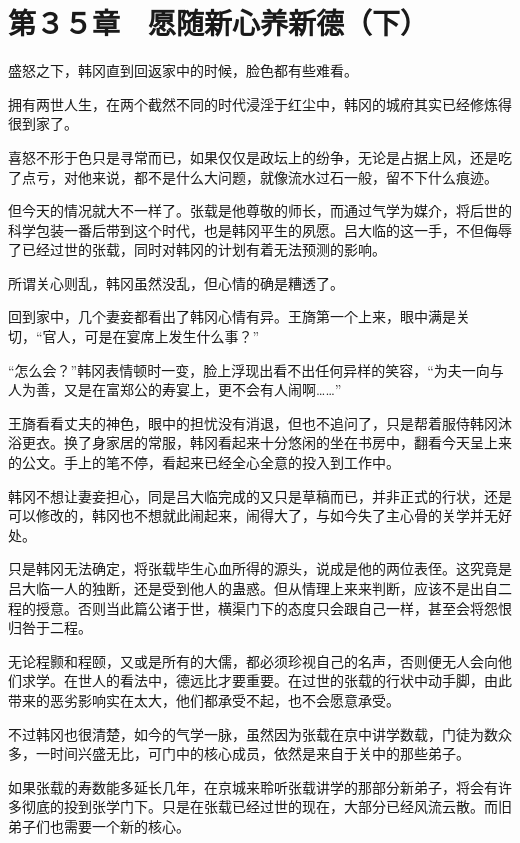 \section{第３５章　愿随新心养新德（下）}

盛怒之下，韩冈直到回返家中的时候，脸色都有些难看。

拥有两世人生，在两个截然不同的时代浸淫于红尘中，韩冈的城府其实已经修炼得很到家了。

喜怒不形于色只是寻常而已，如果仅仅是政坛上的纷争，无论是占据上风，还是吃了点亏，对他来说，都不是什么大问题，就像流水过石一般，留不下什么痕迹。

但今天的情况就大不一样了。张载是他尊敬的师长，而通过气学为媒介，将后世的科学包装一番后带到这个时代，也是韩冈平生的夙愿。吕大临的这一手，不但侮辱了已经过世的张载，同时对韩冈的计划有着无法预测的影响。

所谓关心则乱，韩冈虽然没乱，但心情的确是糟透了。

回到家中，几个妻妾都看出了韩冈心情有异。王旖第一个上来，眼中满是关切，“官人，可是在宴席上发生什么事？”

“怎么会？”韩冈表情顿时一变，脸上浮现出看不出任何异样的笑容，“为夫一向与人为善，又是在富郑公的寿宴上，更不会有人闹啊……”

王旖看看丈夫的神色，眼中的担忧没有消退，但也不追问了，只是帮着服侍韩冈沐浴更衣。换了身家居的常服，韩冈看起来十分悠闲的坐在书房中，翻看今天呈上来的公文。手上的笔不停，看起来已经全心全意的投入到工作中。

韩冈不想让妻妾担心，同是吕大临完成的又只是草稿而已，并非正式的行状，还是可以修改的，韩冈也不想就此闹起来，闹得大了，与如今失了主心骨的关学并无好处。

只是韩冈无法确定，将张载毕生心血所得的源头，说成是他的两位表侄。这究竟是吕大临一人的独断，还是受到他人的蛊惑。但从情理上来来判断，应该不是出自二程的授意。否则当此篇公诸于世，横渠门下的态度只会跟自己一样，甚至会将怨恨归咎于二程。

无论程颢和程颐，又或是所有的大儒，都必须珍视自己的名声，否则便无人会向他们求学。在世人的看法中，德远比才要重要。在过世的张载的行状中动手脚，由此带来的恶劣影响实在太大，他们都承受不起，也不会愿意承受。

不过韩冈也很清楚，如今的气学一脉，虽然因为张载在京中讲学数载，门徒为数众多，一时间兴盛无比，可门中的核心成员，依然是来自于关中的那些弟子。

如果张载的寿数能多延长几年，在京城来聆听张载讲学的那部分新弟子，将会有许多彻底的投到张学门下。只是在张载已经过世的现在，大部分已经风流云散。而旧弟子们也需要一个新的核心。

